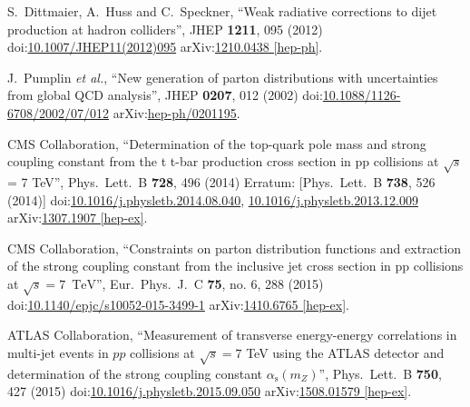 \begin{thebibliography}{99}
S.~Dittmaier, A.~Huss and C.~Speckner, ``Weak radiative corrections to dijet production at hadron colliders'', JHEP {\bf 1211}, 095 (2012) doi:\href{http://dx.doi.org/10.1007/JHEP11(2012)095}{10.1007/JHEP11(2012)095} arXiv:\href{https://arxiv.org/abs/1210.0438}{1210.0438 [hep-ph]}.


J.~Pumplin {\it et al.}, ``New generation of parton distributions with uncertainties from global QCD analysis'', JHEP {\bf 0207}, 012 (2002) doi:\href{http://dx.doi.org/10.1088/1126-6708/2002/07/012}{10.1088/1126-6708/2002/07/012} arXiv:\href{https://arxiv.org/abs/hep-ph/0201195}{hep-ph/0201195}.



 CMS Collaboration, ``Determination of the top-quark pole mass and strong coupling constant from the t t-bar production cross section in pp collisions at $\sqrt{s}$ = 7 TeV'', Phys.\ Lett.\ B {\bf 728}, 496 (2014) Erratum: [Phys.\ Lett.\ B {\bf 738}, 526 (2014)] doi:\href{http://dx.doi.org/10.1016/j.physletb.2014.08.040}{10.1016/j.physletb.2014.08.040}, \href{http://dx.doi.org/10.1016/j.physletb.2013.12.009}{10.1016/j.physletb.2013.12.009} arXiv:\href{https://arxiv.org/abs/1307.1907}{1307.1907 [hep-ex]}.

CMS Collaboration, ``Constraints on parton distribution functions and extraction of the strong coupling constant from the inclusive jet cross section in pp collisions at $\sqrt{s} = 7$ $\,\text {TeV}$'', Eur.\ Phys.\ J.\ C {\bf 75}, no. 6, 288 (2015) doi:\href{http://dx.doi.org/10.1140/epjc/s10052-015-3499-1}{10.1140/epjc/s10052-015-3499-1} arXiv:\href{https://arxiv.org/abs/1410.6765}{1410.6765 [hep-ex]}.

ATLAS Collaboration, ``Measurement of transverse energy-energy correlations in multi-jet events in $pp$ collisions at $\sqrt{s} = 7$ TeV using the ATLAS detector and determination of the strong coupling constant $\alpha_{\mathrm{s}}(m_Z)$'', Phys.\ Lett.\ B {\bf 750}, 427 (2015) doi:\href{http://dx.doi.org/10.1016/j.physletb.2015.09.050}{10.1016/j.physletb.2015.09.050} arXiv:\href{https://arxiv.org/abs/1508.01579}{1508.01579 [hep-ex]}.


\end{thebibliography}
